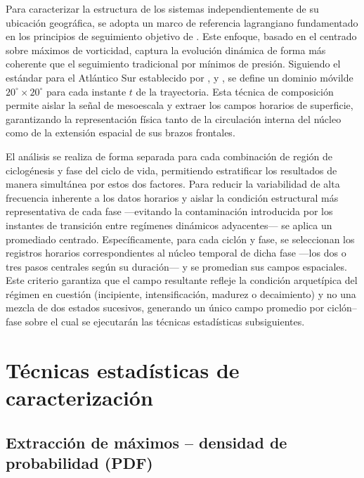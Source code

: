 Para caracterizar la estructura de los sistemas independientemente de su ubicación geográfica, se adopta un marco de referencia lagrangiano fundamentado en los principios de seguimiento objetivo de \citet{sinclair1994objective}. Este enfoque, basado en el centrado sobre máximos de vorticidad, captura la evolución dinámica de forma más coherente que el seguimiento tradicional por mínimos de presión. Siguiendo el estándar para el Atlántico Sur establecido por \citet{crespo2020potential}, \citet{cardoso2022synoptic} y \citet{priestley2022improved}, se define un dominio móvilde $20^{\circ} \times 20^{\circ}$ para cada instante $t$ de la trayectoria. Esta técnica de composición permite aislar la señal de mesoescala y extraer los campos horarios de superficie, garantizando la representación física tanto de la circulación interna del núcleo como de la extensión espacial de sus brazos frontales.

El análisis se realiza de forma separada para cada combinación de región de ciclogénesis y fase del ciclo de vida, permitiendo estratificar los resultados de manera simultánea por estos dos factores. Para reducir la variabilidad de alta frecuencia inherente a los datos horarios y aislar la condición estructural más representativa de cada fase —evitando la contaminación introducida por los instantes de transición entre regímenes dinámicos adyacentes— se aplica un promediado centrado. Específicamente, para cada ciclón y fase, se seleccionan los registros horarios correspondientes al núcleo temporal de dicha fase —los dos o tres pasos centrales según su duración— y se promedian sus campos espaciales. Este criterio garantiza que el campo resultante refleje la condición arquetípica del régimen en cuestión (incipiente, intensificación, madurez o decaimiento) y no una mezcla de dos estados sucesivos, generando un único campo promedio por ciclón--fase sobre el cual se ejecutarán las técnicas estadísticas subsiguientes.

\section{Técnicas estadísticas de caracterización}\label{sec:tecnicas_estadisticas}

\subsection{Extracción de máximos -- densidad de probabilidad (PDF)}\label{subsec:extraccion_pdf}

